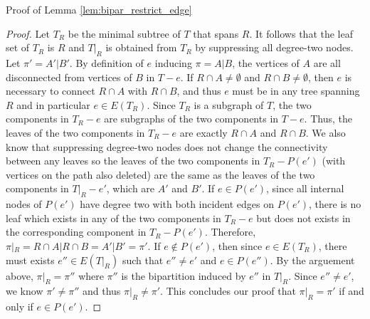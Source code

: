 \documentclass{bmcart}
\begin{document}
Proof of Lemma \ref{lem:bipar_restrict_edge}
\begin{proof}
Let $T_R$ be the minimal subtree of $T$ that spans $R$. It follows that the leaf set of $T_R$ is $R$ and $T|_R$ is obtained from $T_R$ by suppressing all degree-two nodes. Let $\pi' = A'|B'$.
By definition of $e$ inducing $\pi = A|B$, the vertices of $A$ are all disconnected from vertices of $B$ in $T-e$. If $R\cap A \neq \emptyset$ and $R\cap B \neq \emptyset$, then $e$ is necessary to connect $R\cap A$ with $R \cap B$, and thus $e$ must be in any tree spanning $R$ and in particular $e \in E(T_R)$. Since $T_R$ is a subgraph of $T$, the two components in $T_R-e$ are subgraphs of the two components in $T-e$. Thus, the leaves of the two components in $T_R-e$ are exactly $R\cap A$ and $R\cap B$. We also know that suppressing degree-two nodes does not change the connectivity between any leaves so the leaves of the two components in $T_R - P(e')$ (with vertices on the path also deleted) are the same as the leaves of the two components in $T|_R - e'$, which are $A'$ and $B'$. If $e \in P(e')$, since all internal nodes of $P(e')$ have degree two with both incident edges on $P(e')$, there is no leaf which exists in any of the two components in $T_R - e$ but does not exists in the corresponding component in $T_R-P(e')$. Therefore, $\pi|_R = R\cap A|R\cap B = A'|B' = \pi'$. If $e \notin P(e')$, then since $e \in E(T_R)$, there must exists $e'' \in E(T|_R)$ such that $e'' \neq e'$ and $e \in P(e'')$. By the arguement above, $\pi|_R = \pi''$ where $\pi''$ is the bipartition induced by $e''$ in $T|_R$. Since $e'' \neq e'$, we know $\pi' \neq \pi''$ and thus $\pi|_R \neq \pi'$. This concludes our proof that $\pi|_R = \pi'$ if and only if $e \in P(e')$. 
\end{proof}
\end{document}
